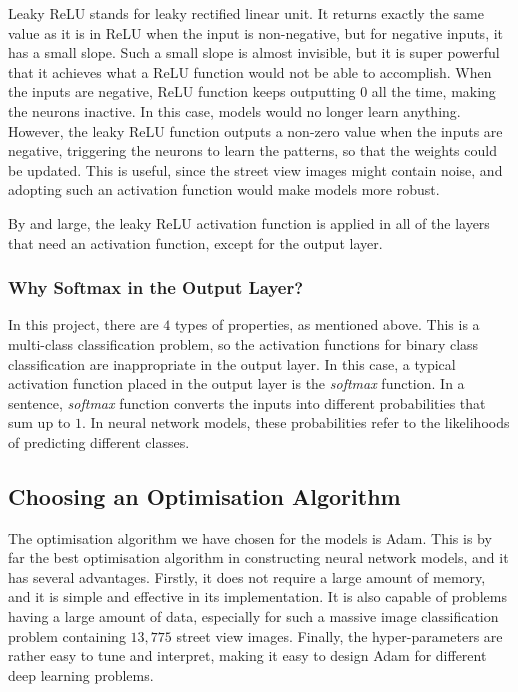 \documentclass[11pt,twoside]{article}
\numberwithin{Theorem}{section}
\numberwithin{Definition}{section}
\numberwithin{Lemma}{section}
\numberwithin{Algorithm}{section}
\numberwithin{equation}{section}
\begin{document}
Leaky ReLU stands for leaky rectified linear unit. It returns exactly the same value as it is in ReLU when the input is non-negative, but for negative inputs, it has a small slope. Such a small slope is almost invisible, but it is super powerful that it achieves what a ReLU function would not be able to accomplish. When the inputs are negative, ReLU function keeps outputting $0$ all the time, making the neurons inactive. In this case, models would no longer learn anything. However, the leaky ReLU function outputs a non-zero value when the inputs are negative, triggering the neurons to learn the patterns, so that the weights could be updated. This is useful, since the street view images might contain noise, and adopting such an activation function would make models more robust. 

By and large, the leaky ReLU activation function is applied in all of the layers that need an activation function, except for the output layer.

\subsubsection{Why Softmax in the Output Layer?}
In this project, there are $4$ types of properties, as mentioned above. This is a multi-class classification problem, so the activation functions for binary class classification are inappropriate in the output layer. In this case, a typical activation function placed in the output layer is the \textit{softmax} function. In a sentence, \textit{softmax} function converts the inputs into different probabilities that sum up to $1$. In neural network models, these probabilities refer to the likelihoods of predicting different classes.

\subsection{Choosing an Optimisation Algorithm}
The optimisation algorithm we have chosen for the models is Adam. This is by far the best optimisation algorithm in constructing neural network models, and it has several advantages. Firstly, it does not require a large amount of memory, and it is simple and effective in its implementation. It is also capable of problems having a large amount of data, especially for such a massive image classification problem containing $13,775$ street view images. Finally, the hyper-parameters are rather easy to tune and interpret, making it easy to design Adam for different deep learning problems.
\end{document}
